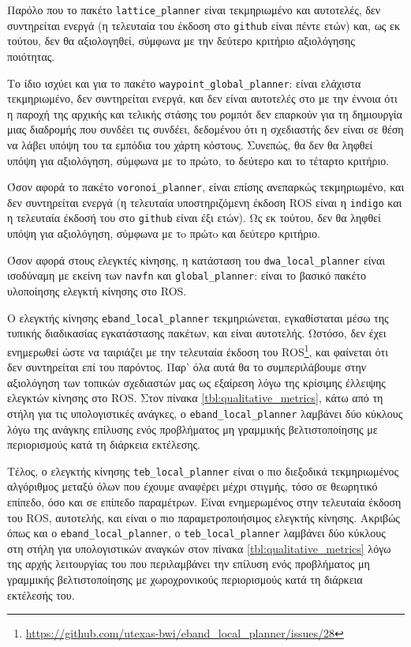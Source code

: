 Παρόλο που το πακέτο \texttt{lattice\_planner} είναι τεκμηριωμένο και
αυτοτελές, δεν συντηρείται ενεργά (η τελευταία του έκδοση στο \texttt{github}
είναι πέντε ετών) και, ως εκ τούτου, δεν θα αξιολογηθεί, σύμφωνα με την δεύτερο
κριτήριο αξιολόγησης ποιότητας.

Το ίδιο ισχύει και για το πακέτο \texttt{waypoint\_global\_planner}: είναι
ελάχιστα τεκμηριωμένο, δεν συντηρείται ενεργά, και δεν είναι αυτοτελές στο με
την έννοια ότι η παροχή της αρχικής και τελικής στάσης του ρομπότ δεν επαρκούν
για τη δημιουργία μιας διαδρομής που συνδέει τις συνδέει, δεδομένου ότι η
σχεδιαστής δεν είναι σε θέση να λάβει υπόψη του τα εμπόδια του χάρτη κόστους.
Συνεπώς, θα δεν θα ληφθεί υπόψη για αξιολόγηση, σύμφωνα με το πρώτο, το
δεύτερο και το τέταρτο κριτήριο.

Όσον αφορά το πακέτο \texttt{voronoi\_planner}, είναι επίσης ανεπαρκώς
τεκμηριωμένο, και δεν συντηρείται ενεργά (η τελευταία υποστηριζόμενη έκδοση ROS
είναι η \texttt{indigo} και η τελευταία έκδοσή του στο \texttt{github} είναι
έξι ετών). Ως εκ τούτου, δεν θα ληφθεί υπόψη για αξιολόγηση, σύμφωνα με τo
πρώτo και δεύτερο κριτήριο.

Όσον αφορά στους ελεγκτές κίνησης, η κατάσταση του \texttt{dwa\_local\_planner}
είναι ισοδύναμη με εκείνη των \texttt{navfn} και \texttt{global\_planner}:
είναι το βασικό πακέτο υλοποίησης ελεγκτή κίνησης στο ROS.

Ο ελεγκτής κίνησης \texttt{eband\_local\_planner} τεκμηριώνεται, εγκαθίσταται
μέσω της τυπικής διαδικασίας εγκατάστασης πακέτων, και είναι αυτοτελής. Ωστόσο,
δεν έχει ενημερωθεί ώστε να ταιριάζει με την τελευταία έκδοση του
ROS\footnote{\url{https://github.com/utexas-bwi/eband\_local\_planner/issues/28}},
και φαίνεται ότι δεν συντηρείται επί του παρόντος. Παρ' όλα αυτά θα το
συμπεριλάβουμε στην αξιολόγηση των τοπικών σχεδιαστών μας ως εξαίρεση λόγω της
κρίσιμης έλλειψης ελεγκτών κίνησης στο ROS. Στον πίνακα
\ref{tbl:qualitative_metrics}, κάτω από τη στήλη για τις υπολογιστικές ανάγκες,
ο \texttt{eband\_local\_planner} λαμβάνει δύο κύκλους λόγω της ανάγκης επίλυσης
ενός προβλήματος μη γραμμικής βελτιστοποίησης με περιορισμούς κατά τη διάρκεια
εκτέλεσης.

Τέλος, ο ελεγκτής κίνησης \texttt{teb\_local\_planner} είναι ο πιο διεξοδικά
τεκμηριωμένος αλγόριθμος μεταξύ όλων που έχουμε αναφέρει μέχρι στιγμής, τόσο σε
θεωρητικό επίπεδο, όσο και σε επίπεδο παραμέτρων. Είναι ενημερωμένος στην
τελευταία έκδοση του ROS, αυτοτελής, και είναι ο πιο παραμετροποιήσιμος
ελεγκτής κίνησης. Ακριβώς όπως και ο \texttt{eband\_local\_planner}, ο
\texttt{teb\_local\_planner} λαμβάνει δύο κύκλους στη στήλη για υπολογιστικών
αναγκών στον πίνακα \ref{tbl:qualitative_metrics} λόγω της αρχής λειτουργίας
του που περιλαμβάνει την επίλυση ενός προβλήματος μη γραμμικής βελτιστοποίησης
με χωροχρονικούς περιορισμούς κατά τη διάρκεια εκτέλεσής του.

